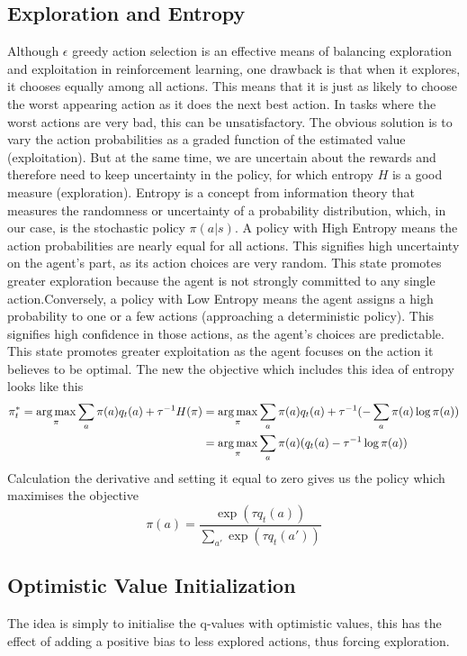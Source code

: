 \subsection{Exploration and Entropy}
Although $\epsilon$ greedy action selection is an effective means of balancing exploration 
and exploitation in reinforcement learning, one 
drawback is that when it explores, it chooses equally among all actions. 
This means that it is just as likely to choose the worst appearing 
action as it does the next best action. In tasks where the worst actions are very bad, this 
can be unsatisfactory. The obvious solution is to vary the action probabilities as a  
graded function of the estimated value (exploitation). But at the same time, we are 
uncertain about the rewards and therefore need to keep uncertainty in the policy, for which 
entropy $H$ is a good measure (exploration). Entropy is a concept from information theory 
that measures the randomness or uncertainty of a probability distribution, which, in our case, is the stochastic policy $\pi(a|s)$.
A policy with High Entropy means the action probabilities are nearly equal for all actions. This signifies high uncertainty on the 
agent's part, as its action choices are very random. This state promotes greater exploration because the agent is not strongly 
committed to any single action.\newline Conversely, a policy with Low Entropy means the agent assigns a high probability to one or a few actions 
(approaching a deterministic policy). This signifies high confidence in those actions, as the agent's choices are predictable. This state promotes 
greater exploitation as the agent focuses on the action it believes to be optimal. The new the objective which includes this idea of entropy looks like this 
\begin{align*}
    \pi^*_t = \operatorname*{arg\,max}\limits_\pi \sum_a \pi(a) q_t(a) + \tau^{-1}H(\pi) &=\operatorname*{arg\,max}\limits_\pi \sum_a \pi(a) q_t(a) + \tau^{-1} (- \sum_a \pi(a)\log{\pi(a)})\\   &=\operatorname*{arg\,max}\limits_\pi \sum_a \pi(a)(q_t(a)-\tau^{-1}\log{\pi(a)})
\end{align*}
Calculation the derivative and setting it equal to zero gives us the policy which maximises the objective $$ \pi(a)= \frac{\exp(\tau q_t(a))}{\sum_{a'}\exp(\tau q_t(a'))}$$

\subsection{Optimistic Value Initialization}
The idea is simply to initialise the q-values with optimistic values, this has the effect of 
adding a positive bias to less explored actions, thus forcing exploration.

